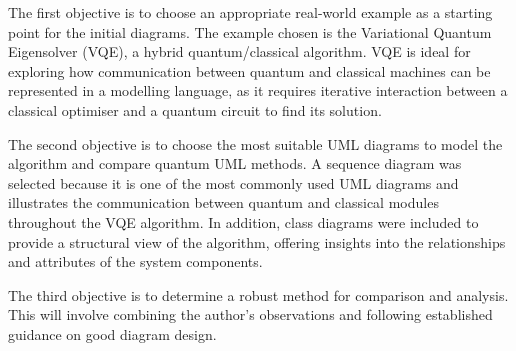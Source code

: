\documentclass{article}
\begin{document}
The first objective is to choose an appropriate real-world example as a starting point for the initial diagrams. The example chosen is the Variational Quantum Eigensolver (VQE), a hybrid quantum/classical algorithm. VQE is ideal for exploring how communication between quantum and classical machines can be represented in a modelling language, as it requires iterative interaction between a classical optimiser and a quantum circuit to find its solution. 

The second objective is to choose the most suitable UML diagrams to model the algorithm and compare quantum UML methods. A sequence diagram was selected because it is one of the most commonly used UML diagrams and illustrates the communication between quantum and classical modules throughout the VQE algorithm. In addition, class diagrams were included to provide a structural view of the algorithm, offering insights into the relationships and attributes of the system components.

The third objective is to determine a robust method for comparison and analysis. This will involve combining the author’s observations and following established guidance on good diagram design.
\end{document}
